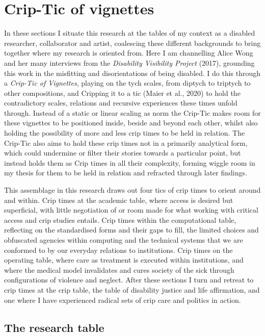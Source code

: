 \hypertarget{crip-tic-of-vignettes}{%
\section{Crip-Tic of vignettes}\label{crip-tic-of-vignettes}}

In these sections I situate this research at the tables of my context as
a disabled researcher, collaborator and artist, coalescing these
different backgrounds to bring together where my research is oriented
from. Here I am channelling Alice Wong and her many interviews from the
\emph{Disability Visibility Project} (2017), grounding this work in the
misfitting and disorientations of being disabled. I do this through a
\emph{Crip-Tic of Vignettes}, playing on the tych scales, from diptych
to triptych to other compositions, and Cripping it to a tic (Maier et
al., 2020) to hold the contradictory scales, relations and recursive
experiences these times unfold through. Instead of a static or linear
scaling as norm the Crip-Tic makes room for these vignettes to be
positioned inside, beside and beyond each other, whilst also holding the
possibility of more and less crip times to be held in relation. The
Crip-Tic also aims to hold these crip times not in a primarily
analytical form, which could undermine or filter their stories towards a
particular point, but instead holds them as Crip times in all their
complexity, forming wiggle room in my thesis for them to be held in
relation and refracted through later findings.

This assemblage in this research draws out four tics of crip times to
orient around and within. Crip times at the academic table, where access
is desired but superficial, with little negotiation of or room made for
what working with critical access and crip studies entails. Crip times
within the computational table, reflecting on the standardised forms and
their gaps to fill, the limited choices and obfuscated agencies within
computing and the technical systems that we are conformed to by our
everyday relations to institutions. Crip times on the operating table,
where care as treatment is executed within institutions, and where the
medical model invalidates and cures society of the sick through
configurations of violence and neglect. After these sections I turn and
retreat to crip times at the crip table, the table of disability justice
and life affirmation, and one where I have experienced radical sets of
crip care and politics in action.

\hypertarget{the-research-table}{%
\subsection{The research table}\label{the-research-table}}

